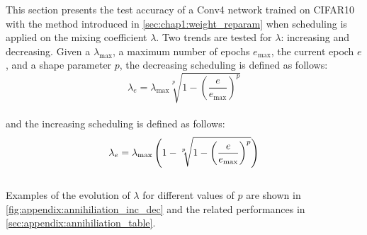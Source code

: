 This section presents the test accuracy of a Conv4 network trained on CIFAR10
with the method introduced in \cref{sec:chap1:weight_reparam} when scheduling is
applied on the mixing coefficient $\lambda$. Two trends are tested for
$\lambda$: increasing and decreasing. Given a $\lambda_\text{max}$, a maximum
number of epochs $e_\text{max}$, the current epoch $e$, and a shape parameter
$p$, the decreasing scheduling is defined as follows:\\
$$
    \lambda_e = \lambda_\text{max}  \sqrt[p~]{1 - \displaystyle\left(\frac{e}{e_\text{max}}\right)^p}
$$\\
and the increasing scheduling is defined as follows:\\
$$\\
    \lambda_e = \lambda_\text{max} \left( 1- \sqrt[p~]{ 1 - \left(\frac{e}{e_\text{max}}\right)^p} \right)
$$\\
Examples of the evolution of $\lambda$ for different values of $p$ are shown in
\cref{fig:appendix:annihiliation_inc_dec} and the related performances in
\cref{sec:appendix:annihiliation_table}.\\


